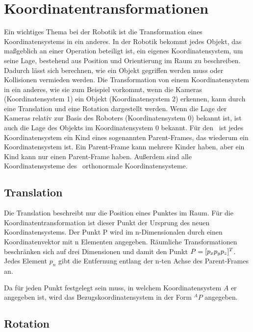 \section{Koordinatentransformationen}

Ein wichtiges Thema bei der Robotik ist die Transformation eines 
Koordinatensystems in ein anderes. In der Robotik bekommt jedes
Objekt, das maßgeblich an einer Operation beteiligt ist, ein eigenes
Koordinatensystem, um seine Lage, bestehend aus Position und Orientierung
im Raum zu beschreiben. Dadurch lässt sich berechnen, wie ein Objekt gegriffen
werden muss oder Kollisionen vermieden werden. Die Transformation von einem 
Koordinatensystem in ein anderes, wie sie zum Beispiel vorkommt, wenn die 
Kameras (Koordinatensystem 1) ein Objekt (Koordinatensystem 2) erkennen, kann
durch eine Translation und eine Rotation dargestellt werden. Wenn die Lage der
Kameras relativ zur Basis des Roboters (Koordinatensystem 0) bekannt ist, ist
auch die Lage des Objekts im Koordinatensystem 0 bekannt. Für den \cob\ ist 
jedes Koordinatensystem ein Kind eines sogenannten Parent-Frames, das wiederum 
ein Koordinatensystem ist. Ein Parent-Frame kann mehrere Kinder haben, aber ein
Kind kann nur einen Parent-Frame haben. Außerdem sind alle Koordinatensysteme
des \cob\ orthonormale Koordinatensysteme. 

\subsection{Translation}
\label{sub:Translation}


Die Translation beschreibt nur die Position eines Punktes im Raum. Für die 
Koordinatentransformation ist dieser Punkt der Ursprung des neuen Koordinatensystems.
Der Punkt P wird im n-Dimensionalen durch einen Koordinatenvektor mit n 
Elementen angegeben. Räumliche Transformationen beschränken sich auf drei Dimensionen
und damit den Punkt $P= [p_x\\p_y\\p_z]^T$. Jedes Element $p_n$ gibt die Entfernung
entlang der n-ten Achse des Parent-Frames an.

Da für jeden Punkt festgelegt sein muss, in welchem Koordinatensystem $A$ er angegeben
ist, wird das Bezugskoordinatensystem in der Form $^AP$ angegeben.

\subsection{Rotation}
\label{sub:Rotation}

